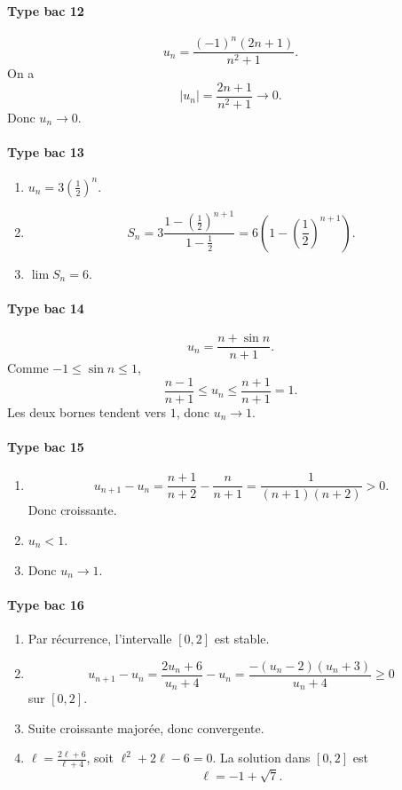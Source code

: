 \documentclass[11pt,a4paper]{article}
\theoremstyle{definition}
\begin{document}
\paragraph{Type bac 12}
\[
u_n=\frac{(-1)^n(2n+1)}{n^2+1}.
\]
On a
\[
|u_n|=\frac{2n+1}{n^2+1}\to0.
\]
Donc $u_n\to0$.

\paragraph{Type bac 13}
\begin{enumerate}[label=\arabic*.]
    \item $u_n=3\left(\frac12\right)^n$.
    \item
    \[
    S_n=3\frac{1-\left(\frac12\right)^{n+1}}{1-\frac12}=6\left(1-\left(\frac12\right)^{n+1}\right).
    \]
    \item $\lim S_n=6$.
\end{enumerate}

\paragraph{Type bac 14}
\[
u_n=\frac{n+\sin n}{n+1}.
\]
Comme $-1\le \sin n\le1$,
\[
\frac{n-1}{n+1}\le u_n\le \frac{n+1}{n+1}=1.
\]
Les deux bornes tendent vers $1$, donc $u_n\to1$.

\paragraph{Type bac 15}
\begin{enumerate}[label=\arabic*.]
    \item
    \[
    u_{n+1}-u_n=\frac{n+1}{n+2}-\frac{n}{n+1}=\frac1{(n+1)(n+2)}>0.
    \]
    Donc croissante.
    \item $u_n<1$.
    \item Donc $u_n\to1$.
\end{enumerate}

\paragraph{Type bac 16}
\begin{enumerate}[label=\arabic*.]
    \item Par récurrence, l'intervalle $[0,2]$ est stable.
    \item
    \[
    u_{n+1}-u_n=\frac{2u_n+6}{u_n+4}-u_n=\frac{-(u_n-2)(u_n+3)}{u_n+4}\ge0
    \]
    sur $[0,2]$.
    \item Suite croissante majorée, donc convergente.
    \item $\ell=\frac{2\ell+6}{\ell+4}$, soit $\ell^2+2\ell-6=0$. La solution dans $[0,2]$ est
    \[
    \ell=-1+\sqrt7.
    \]
\end{enumerate}
\end{document}

